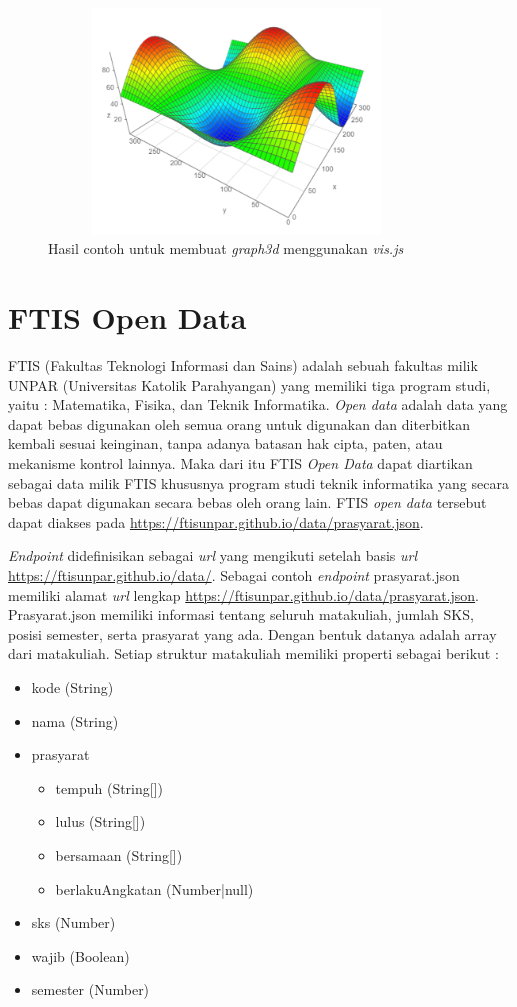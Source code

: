 \begin{figure}[H]
    \centering
    \includegraphics[width=10cm, height=6cm]{Gambar/hasilGraph3d.png}
    \caption{Hasil contoh untuk membuat \textit{graph3d} menggunakan \textit{vis.js}}
    \label{fig:gambarHasilGraph3d}
\end{figure}

\section{FTIS Open Data}
FTIS (Fakultas Teknologi Informasi dan Sains) adalah sebuah fakultas milik UNPAR (Universitas Katolik Parahyangan) yang memiliki tiga program studi, yaitu : Matematika, Fisika, dan Teknik Informatika. \textit{Open data} adalah data yang dapat bebas digunakan oleh semua orang untuk digunakan dan diterbitkan kembali sesuai keinginan, tanpa adanya batasan hak cipta, paten, atau mekanisme kontrol lainnya. Maka dari itu FTIS \textit{Open Data} dapat diartikan sebagai data milik FTIS khususnya program studi teknik informatika yang secara bebas dapat digunakan secara bebas oleh orang lain. FTIS \textit{open data} tersebut dapat diakses pada \url{https://ftisunpar.github.io/data/prasyarat.json}. \cite{ftisOpenData}

\textit{Endpoint} didefinisikan sebagai \textit{url} yang mengikuti setelah basis \textit{url} \url{https://ftisunpar.github.io/data/}. Sebagai contoh \textit{endpoint} prasyarat.json memiliki alamat \textit{url} lengkap \url{https://ftisunpar.github.io/data/prasyarat.json}. Prasyarat.json memiliki informasi tentang seluruh matakuliah, jumlah SKS, posisi semester, serta prasyarat yang ada. Dengan bentuk datanya adalah array dari matakuliah. Setiap struktur matakuliah memiliki properti sebagai berikut : 

\begin{itemize}
    \item kode (String)
    \item nama (String)
    \item prasyarat
    \begin{itemize}
        \item tempuh (String[])
        \item lulus (String[])
        \item bersamaan (String[])
        \item berlakuAngkatan (Number|null)
    \end{itemize}
    \item sks (Number)
    \item wajib (Boolean)
    \item semester (Number)
\end{itemize}

